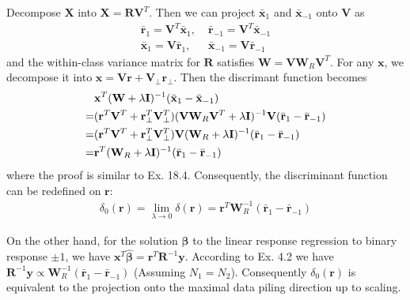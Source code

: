\begin{exercise}
  Decompose $\mathbf{X}$ into $\mathbf{X}=\mathbf{RV}^T$. Then we can project
  $\bar{\mathbf{x}}_1$ and $\bar{\mathbf{x}}_{-1}$ onto $\mathbf{V}$ as
  \begin{align}
    \bar{\mathbf{r}}_1 = \mathbf{V}^T\bar{\mathbf{x}}_1, &\;
    \bar{\mathbf{r}}_{-1} = \mathbf{V}^T\bar{\mathbf{x}}_{-1} \\
    \bar{\mathbf{x}}_1 = \mathbf{V}\bar{\mathbf{r}}_1, &\; 
    \bar{\mathbf{x}}_{-1} = \mathbf{V}\bar{\mathbf{r}}_{-1}
  \end{align}
  and the within-class variance matrix for $\mathbf{R}$ satisfies $\mathbf{W} =
  \mathbf{V}\mathbf{W}_R\mathbf{V}^T$. For any $\mathbf{x}$, we decompose it
  into $\mathbf{x} = \mathbf{Vr} + \mathbf{V}_{\perp}\mathbf{r}_{\perp}$. Then
  the discrimant function becomes
  \begin{align}
    & \mathbf{x}^T(\mathbf{W} + \lambda\mathbf{I})^{-1}(\bar{\mathbf{x}}_1 -
    \bar{\mathbf{x}}_{-1}) \notag \\
    = & (\mathbf{r}^T\mathbf{V}^T + \mathbf{r}_{\perp}^T\mathbf{V}_{\perp}^T)
    (\mathbf{V}\mathbf{W}_R\mathbf{V}^T +
    \lambda\mathbf{I})^{-1}\mathbf{V}(\bar{\mathbf{r}}_1 -
    \bar{\mathbf{r}}_{-1}) \notag \\
    = & (\mathbf{r}^T\mathbf{V}^T + \mathbf{r}_{\perp}^T\mathbf{V}_{\perp}^T)
    \mathbf{V}(\mathbf{W}_R + \lambda\mathbf{I})^{-1}(\bar{\mathbf{r}}_1 -
    \bar{\mathbf{r}}_{-1})\notag \\
    = & \mathbf{r}^T(\mathbf{W}_R + \lambda\mathbf{I})^{-1}(\bar{\mathbf{r}}_1 -
    \bar{\mathbf{r}}_{-1})
  \end{align}
  where the proof is similar to Ex. 18.4. Consequently, the discriminant
  function can be redefined on $\mathbf{r}$:
  \begin{align}
    \delta_0(\mathbf{r}) = \lim_{\lambda\rightarrow 0}\delta(\mathbf{r}) =
    \mathbf{r}^T \mathbf{W}_R^{-1}(\bar{\mathbf{r}}_1 -
    \bar{\mathbf{r}}_{-1})
  \end{align}
  
  On the other hand, for the solution $\hat{\bm{\beta}}$ to the linear response
  regression to binary response $\pm1$, we have $\mathbf{x}^{T}\hat{\bm{\beta}} =
  \mathbf{r}^{T}\mathbf{R}^{-1}\mathbf{y}$.
  According to Ex. 4.2 we have $\mathbf{R}^{-1}\mathbf{y} \propto
  \mathbf{W}_R^{-1}(\bar{\mathbf{r}}_1 - \bar{\mathbf{r}}_{-1})$ (Assuming
  $N_1=N_2$). Consequently $\delta_0(\mathbf{r})$ is equivalent to the
  projection onto the maximal data piling direction up to scaling.
\end{exercise}

